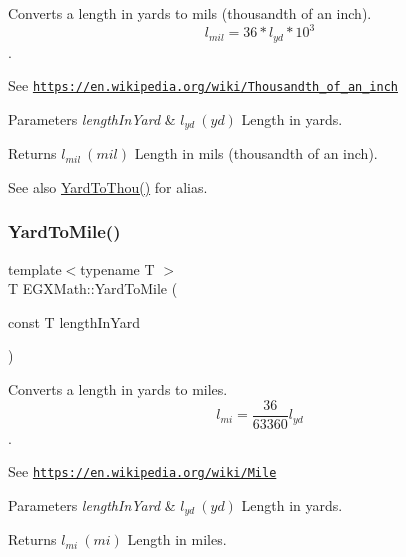 Converts a length in yards to mils (thousandth of an inch). \[ l_{mil}=36 * l_{yd} * 10^{3} \]. 

See \href{https://en.wikipedia.org/wiki/Thousandth_of_an_inch}{\tt https\+://en.\+wikipedia.\+org/wiki/\+Thousandth\+\_\+of\+\_\+an\+\_\+inch} 
\begin{DoxyParams}{Parameters}
{\em length\+In\+Yard} & $ l_{yd}\ (yd)$ Length in yards. \\
\hline
\end{DoxyParams}
\begin{DoxyReturn}{Returns}
$ l_{mil}\ (mil)$ Length in mils (thousandth of an inch). 
\end{DoxyReturn}
\begin{DoxySeeAlso}{See also}
\mbox{\hyperlink{group___e_g_x_math-_conversions-_length_conversions-_imperial-_yard-_imperial_ga396e348746bc01bce2844579b2b3d90f}{Yard\+To\+Thou()}} for alias. 
\end{DoxySeeAlso}
\mbox{\label{group___e_g_x_math-_conversions-_length_conversions-_imperial-_yard-_imperial_ga8bd451c3f9a1af1afb769812587d7dc6}} 
\subsubsection{\texorpdfstring{Yard\+To\+Mile()}{YardToMile()}}
{\footnotesize\ttfamily template$<$typename T $>$ \\
T E\+G\+X\+Math\+::\+Yard\+To\+Mile (\begin{DoxyParamCaption}\item[{const T}]{length\+In\+Yard }\end{DoxyParamCaption})}



Converts a length in yards to miles. \[ l_{mi}=\frac{36}{63360} l_{yd} \]. 

See \href{https://en.wikipedia.org/wiki/Mile}{\tt https\+://en.\+wikipedia.\+org/wiki/\+Mile} 
\begin{DoxyParams}{Parameters}
{\em length\+In\+Yard} & $ l_{yd}\ (yd)$ Length in yards. \\
\hline
\end{DoxyParams}
\begin{DoxyReturn}{Returns}
$ l_{mi}\ (mi)$ Length in miles. 
\end{DoxyReturn}
\mbox{\label{group___e_g_x_math-_conversions-_length_conversions-_imperial-_yard-_imperial_ga396e348746bc01bce2844579b2b3d90f}} 
